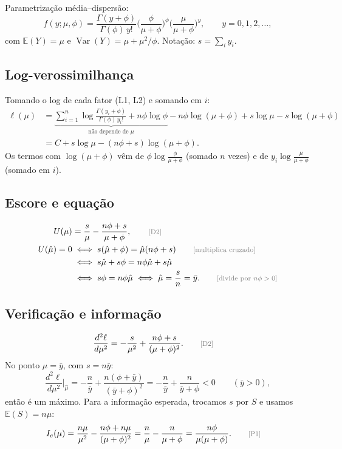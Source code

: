 \documentclass[11pt,a4paper]{article}
\newcommand{\E}{\mathbb{E}}
\newcommand{\Var}{\operatorname{Var}}
\newcommand{\just}[1]{\tag*{\footnotesize\textcolor{gray}{[#1]}}}
\theoremstyle{definition}
\theoremstyle{plain}
\begin{document}
Parametrização média--dispersão:
\[
f(y;\mu,\phi)=\frac{\Gamma(y+\phi)}{\Gamma(\phi)\,y!}\Big(\frac{\phi}{\mu+\phi}\Big)^\phi\Big(\frac{\mu}{\mu+\phi}\Big)^y,\qquad y=0,1,2,\dots,
\]
com $\E(Y)=\mu$ e $\Var(Y)=\mu+\mu^2/\phi$. Notação: $s=\sum_iy_i$.

\subsection*{Log-verossimilhança}
Tomando o log de cada fator (L1, L2) e somando em $i$:
\begin{align*}
\ell(\mu)&=\underbrace{\sum_{i=1}^n\log\frac{\Gamma(y_i+\phi)}{\Gamma(\phi)\,y_i!}+n\phi\log\phi}_{\text{não depende de }\mu}
-n\phi\log(\mu+\phi)+s\log\mu-s\log(\mu+\phi)\\
&=C+s\log\mu-(n\phi+s)\log(\mu+\phi).
\end{align*}
Os termos com $\log(\mu+\phi)$ vêm de $\phi\log\frac{\phi}{\mu+\phi}$ (somado $n$ vezes) e de $y_i\log\frac{\mu}{\mu+\phi}$ (somado em $i$).

\subsection*{Escore e equação}
\begin{align*}
U(\mu)&=\frac{s}{\mu}-\frac{n\phi+s}{\mu+\phi}, \just{D2}\\
U(\hat\mu)=0&\iff s(\hat\mu+\phi)=\hat\mu(n\phi+s) \just{multiplica cruzado}\\
&\iff s\hat\mu+s\phi=n\phi\hat\mu+s\hat\mu\\
&\iff s\phi=n\phi\hat\mu\iff\hat\mu=\frac sn=\bar y . \just{divide por $n\phi>0$}
\end{align*}

\subsection*{Verificação e informação}
\begin{align*}
\frac{d^2\ell}{d\mu^2}&=-\frac{s}{\mu^2}+\frac{n\phi+s}{(\mu+\phi)^2}. \just{D2}
\end{align*}
No ponto $\mu=\bar y$, com $s=n\bar y$:
\[
\frac{d^2\ell}{d\mu^2}\Big|_{\hat\mu}=-\frac{n}{\bar y}+\frac{n(\phi+\bar y)}{(\bar y+\phi)^2}=-\frac{n}{\bar y}+\frac{n}{\bar y+\phi}<0
\qquad(\bar y>0),
\]
então é um máximo. Para a informação esperada, trocamos $s$ por $S$ e usamos $\E(S)=n\mu$:
\begin{align*}
I_e(\mu)&=\frac{n\mu}{\mu^2}-\frac{n\phi+n\mu}{(\mu+\phi)^2}=\frac{n}{\mu}-\frac{n}{\mu+\phi}=\frac{n\phi}{\mu(\mu+\phi)}. \just{P1}
\end{align*}
\end{document}
